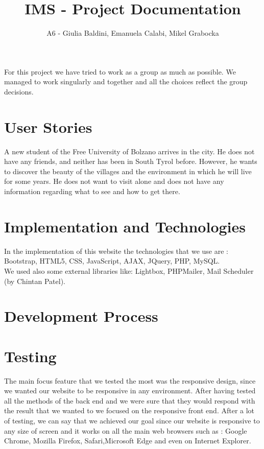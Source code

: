 \documentclass[a4paper]{article}
\title{IMS - Project Documentation}
\author{A6 - Giulia Baldini, Emanuela Calabi, Mikel Grabocka}
\begin{document}
	\maketitle
	
	\noindent For this project we have tried to work as a group as much as possible. We managed to work singularly and together and all the choices reflect the group decisions.
	
	\section{User Stories}
	
	A new student of the Free University of Bolzano arrives in the city. He does not have any friends, and neither has been in South Tyrol before. However, he wants to discover the beauty of the villages and the environment in which he will live for some years. He does not want to visit alone and does not have any information regarding what to see and how to get there.

	
	\section{Implementation and Technologies}	
	In the implementation of this website the technologies that we use are : Bootstrap, HTML5, CSS, JavaScript, AJAX, JQuery, PHP, MySQL.\\
	We used also some external libraries like:
Lightbox, PHPMailer, Mail Scheduler (by Chintan Patel).

	\section{Development Process}

	\section{Testing}
	The main focus feature that we tested the most was the responsive design, since we wanted our website to be responsive in any environment. After having tested all the methods of the back end and we were sure that they would respond with the result that we wanted to we focused on the responsive front end. After a lot of testing, we can say that we achieved our goal since our website is responsive to any size of screen and it works on  all the main web browsers such as : Google Chrome, Mozilla Firefox, Safari,Microsoft Edge and even on Internet Explorer.
	
\end{document}
